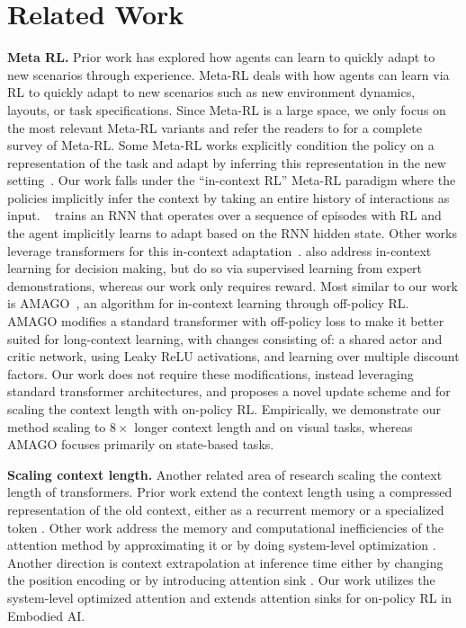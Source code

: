\section{Related Work}

\textbf{Meta RL.} Prior work has explored how agents can learn to quickly adapt to new scenarios through experience.
Meta-RL deals with how agents can learn via RL to quickly adapt to new scenarios such as new environment dynamics, layouts, or task specifications.
Since Meta-RL is a large space, we only focus on the most relevant Meta-RL variants and refer the readers to \citet{beck2023survey} for a complete survey of Meta-RL.
Some Meta-RL works explicitly condition the policy on a representation of the task and adapt by inferring this representation in the new setting~\citep{zhao2020meld,yu2020learning,rakelly2019efficient}.
Our work falls under the ``in-context RL'' Meta-RL paradigm where the policies implicitly infer the context by taking an entire history of interactions as input.
\rls~\cite{duan2016rl} trains an RNN that operates over a sequence of episodes with RL and the agent implicitly learns to adapt based on the RNN hidden state. 
Other works leverage transformers for this in-context adaptation~\citep{team2023human,melo2022transformers,laskin2022context}.
\cite{raparthy2023generalizationnewsequentialdecision,lee2023supervisedpretraininglearnincontext} also address in-context learning for decision making, but do so via supervised learning from expert demonstrations, whereas our work only requires reward.
Most similar to our work is AMAGO~\citep{grigsby2023amago}, an algorithm for in-context learning through off-policy RL.
AMAGO modifies a standard transformer with off-policy loss to make it better suited for long-context learning, with changes consisting of: a shared actor and critic network, using Leaky ReLU activations, and learning over multiple discount factors.
Our work does not require these modifications, instead leveraging standard transformer architectures, and proposes a novel update scheme and \sinkv for scaling the context length with on-policy RL.
Empirically, we demonstrate our method scaling to $8\times$ longer context length and on visual tasks, whereas AMAGO focuses primarily on state-based tasks.

\textbf{Scaling context length.}
Another related area of research scaling the context length of transformers.
Prior work extend the context length using a compressed representation of the old context, either as a recurrent memory or a specialized token \citep{dai2019transformerxl,munkhdalai2024leave,zhang2024soaring}.
Other work address the memory and computational inefficiencies of the attention method by approximating it \citep{beltagy2020longformer,wang2020linformer} or by doing system-level optimization \citep{dao2023flashattention2}. Another direction is context extrapolation at inference time either by changing the position encoding \citep{su2023roformer,press2022train} or by introducing attention sink \citep{xiao2023efficient}. Our work utilizes the system-level optimized attention \citep{dao2023flashattention2} and extends attention sinks for on-policy RL in Embodied AI.

